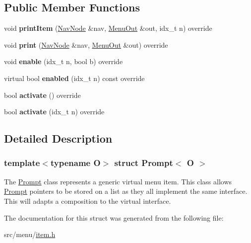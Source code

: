\subsection*{Public Member Functions}
\begin{DoxyCompactItemize}
\item 
\mbox{\label{structPrompt_a00ec62ca84f509b26898137e2df772f9}} 
void {\bfseries print\+Item} (\hyperlink{structNavNode}{Nav\+Node} \&nav, \hyperlink{structMenuOut}{Menu\+Out} \&out, idx\+\_\+t n) override
\item 
\mbox{\label{structPrompt_a2ce155e8c7582809fc15802e06954fab}} 
void {\bfseries print} (\hyperlink{structNavNode}{Nav\+Node} \&nav, \hyperlink{structMenuOut}{Menu\+Out} \&out) override
\item 
\mbox{\label{structPrompt_a40a2fe7ed21396bedd6b65b2db5400a6}} 
void {\bfseries enable} (idx\+\_\+t n, bool b) override
\item 
\mbox{\label{structPrompt_a4f769df1e55e65f6a07d297efb15cf44}} 
virtual bool {\bfseries enabled} (idx\+\_\+t n) const override
\item 
\mbox{\label{structPrompt_aa5befa00eeae10f725e06c2c087d177d}} 
bool {\bfseries activate} () override
\item 
\mbox{\label{structPrompt_a6245d593b4c924276faeb8b5b4424e53}} 
bool {\bfseries activate} (idx\+\_\+t n) override
\end{DoxyCompactItemize}


\subsection{Detailed Description}
\subsubsection*{template$<$typename O$>$\newline
struct Prompt$<$ O $>$}

The \hyperlink{structPrompt}{Prompt} class represents a generic virtual menu item. This class allows \hyperlink{structPrompt}{Prompt} pointers to be stored on a list as they all implement the same interface. This will adapts a composition to the virtual interface. 

The documentation for this struct was generated from the following file\+:\begin{DoxyCompactItemize}
\item 
src/menu/\hyperlink{item_8h}{item.\+h}\end{DoxyCompactItemize}
